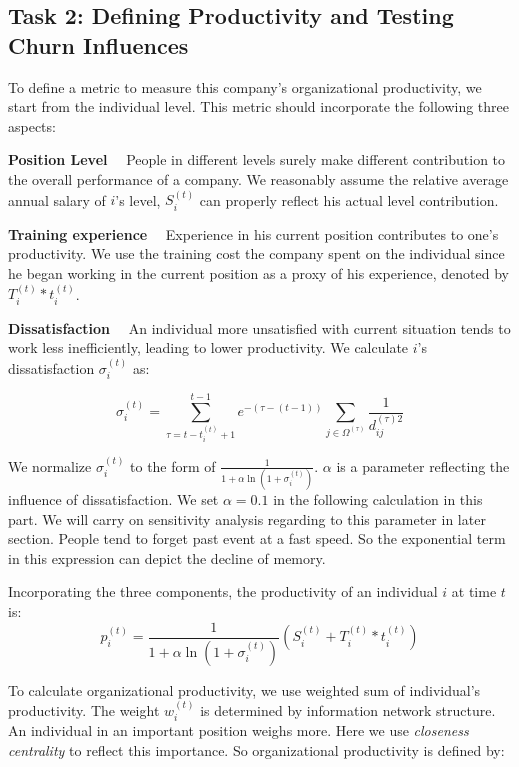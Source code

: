 \documentclass[tcn = 37075, sheet = false, abstract = false]{mcmthesis}
\begin{document}
\subsection{Task 2: Defining Productivity and Testing Churn Influences}

To define a metric to measure this company's organizational productivity, we start from the individual level. This metric should incorporate the following three aspects:

\noindent \textbf{Position Level} \ \ People in different levels surely make different contribution to the overall performance of a company. We reasonably assume the relative average annual salary of $i$'s level, $S_i^{(t)}$ can properly reflect his actual level contribution.


\noindent \textbf{Training experience} \ \ Experience in his current position contributes to one's productivity. We use the training cost the company spent on the individual since he began working in the current position as a proxy of his experience, denoted by $T_i^{(t)}*t_i^{(t)}$.


\noindent \textbf{Dissatisfaction} \ \ An individual more unsatisfied with current situation tends to work less inefficiently, leading to lower productivity. We calculate $i$'s dissatisfaction $\sigma_i^{(t)}$ as:

$$\displaystyle \sigma_i^{(t)}=\sum_{\tau=t-t_i^{(t)}+1}^{t-1}e^{-(\tau-(t-1))}\sum_{j\in \Omega^{(\tau)}}\frac{1}{d_{ij}^{(\tau)2}}$$

We normalize $\sigma_i^{(t)}$ to the form of $\frac{1}{1+\alpha\ln{(1+\sigma_i^{(t)})}}$. $\alpha$ is a parameter reflecting the influence of dissatisfaction. We set $\displaystyle \alpha = 0.1$ in the following calculation in this part. We will carry on sensitivity analysis regarding to this parameter in later section. People tend to forget past event at a fast speed\cite{ebbighaus1913memory}. So the exponential term in this expression can depict the decline of memory.

Incorporating the three components, the productivity of an individual $i$ at time $t$ is:
$$ p_i^{(t)}=\frac{1}{1+\alpha\ln{(1+\sigma_i^{(t)})}}(S_i^{(t)}+T_i^{(t)}*t_i^{(t)})$$

To calculate organizational productivity, we use weighted sum of individual's productivity. The weight $w_i^{(t)}$ is determined by information network structure. An individual in an important position weighs more. Here we use \textit{closeness centrality} to reflect this importance. So organizational productivity is defined by:
\end{document}
